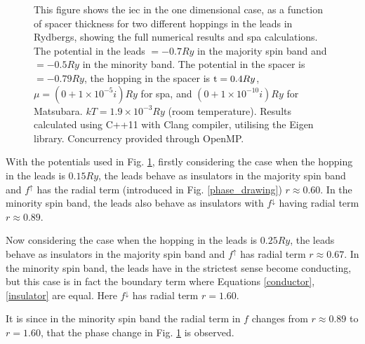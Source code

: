 \documentclass[a4paper, 12pt]{article}
\begin{document}
	\begin{figure}[H]
\caption{\footnotesize This figure shows the \gls{iec} in the one dimensional case, as a function of spacer thickness for two different hoppings in the leads in Rydbergs, showing the full numerical results and \gls{spa} calculations.
The potential in the leads $= -0.7Ry$ in the majority spin band and $=-0.5Ry$ in the minority band. The potential in the spacer is $= -0.79Ry$, the hopping in the spacer is ${\rm t} = 0.4Ry$, $\mu= (0 + 1\times 10^{-5}i)Ry$ for \gls{spa}, and $(0+1\times 10^{-10}i)Ry$ for Matsubara. $kT = 1.9\times 10^{-3}Ry$ (room temperature).  Results calculated using C++11 with Clang compiler, utilising the Eigen library. Concurrency provided through OpenMP.
}\label{phase_graph}
\end{figure}
With the potentials used in Fig. \ref{phase_graph}, firstly considering the case when the hopping in the leads is $0.15Ry$, the leads behave as insulators in the majority spin band and $f^\uparrow$ has the radial term (introduced in Fig. \ref{phase_drawing}) $r\approx 0.60$. In the minority spin band, the leads also behave as insulators with $f^\downarrow$ having radial term $r\approx 0.89$. 
\par Now considering the case when the hopping in the leads is $0.25Ry$, the leads behave as insulators in the majority spin band and $f^\uparrow$ has radial term $r\approx 0.67$. In the minority spin band, the leads have in the strictest sense become conducting, but this case is in fact the boundary term where Equations \eqref{conductor}, \eqref{insulator} are equal. Here $f^\downarrow$ has radial term $r=1.60$.
\par It is since in the minority spin band the radial term in $f$ changes from $r\approx0.89$ to $r=1.60$, that the phase change in Fig. \ref{phase_graph} is observed.
\end{document}
